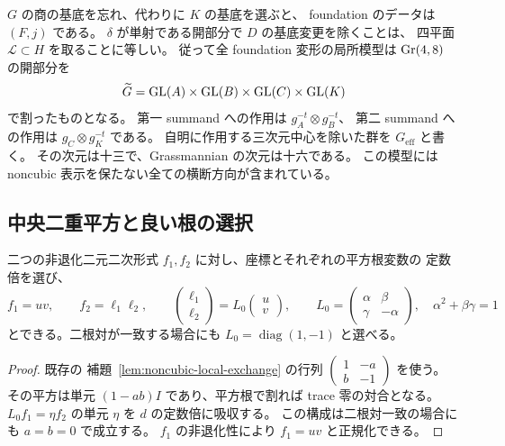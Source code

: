 \begin{remark}[全変形空間を使うこと]
$G$ の商の基底を忘れ、代わりに $K$ の基底を選ぶと、
foundation のデータは $(F,j)$ である。
$\delta$ が単射である開部分で $D$ の基底変更を除くことは、
四平面 $\mathscr L\subset H$ を取ることに等しい。
従って全 foundation 変形の局所模型は
$\operatorname{Gr}(4,8)$ の開部分を
\[
\widetilde G=\operatorname{GL}(A)\times\operatorname{GL}(B)\times\operatorname{GL}(C)\times\operatorname{GL}(K)
\]
で割ったものとなる。
第一 summand への作用は $g_A^{-t}\otimes g_B^{-t}$、
第二 summand への作用は $g_C\otimes g_K^{-t}$ である。
自明に作用する三次元中心を除いた群を $G_{\mathrm{eff}}$ と書く。
その次元は十三で、Grassmannian の次元は十六である。
この模型には noncubic 表示を保たない全ての横断方向が含まれている。
\end{remark}

\subsection{中央二重平方と良い根の選択}

\begin{lemma}\label{lem:nchh-exchange}
二つの非退化二元二次形式 $f_1,f_2$ に対し、座標とそれぞれの平方根変数の
定数倍を選び、
\begin{equation}\label{eq:nchh-normal-forms}
f_1=uv,\qquad f_2=\ell_1\ell_2,
\qquad
\begin{pmatrix}\ell_1\\\ell_2\end{pmatrix}
=L_0\begin{pmatrix}u\\v\end{pmatrix},\qquad
L_0=\begin{pmatrix}\alpha&\beta\\\gamma&-\alpha\end{pmatrix},\quad
\alpha^2+\beta\gamma=1
\end{equation}
とできる。二根対が一致する場合にも $L_0=\operatorname{diag}(1,-1)$ と選べる。
\end{lemma}
\begin{proof}
既存の 補題~\ref{lem:noncubic-local-exchange} の行列
$\left(\begin{smallmatrix}1&-a\\b&-1\end{smallmatrix}\right)$ を使う。
その平方は単元 $(1-ab)I$ であり、平方根で割れば trace 零の対合となる。
$L_0f_1=\eta f_2$ の単元 $\eta$ を $d$ の定数倍に吸収する。
この構成は二根対一致の場合にも $a=b=0$ で成立する。
$f_1$ の非退化性により $f_1=uv$ と正規化できる。
\end{proof}

